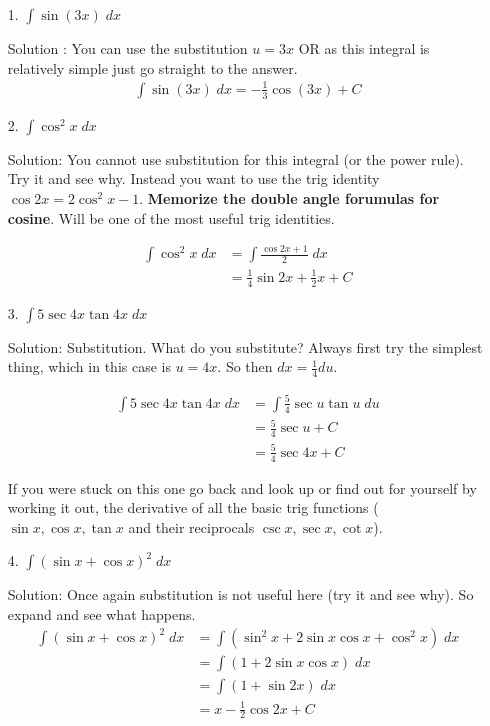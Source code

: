 \documentclass[11pt,reqno]{article}
\theoremstyle{definition}
\begin{document}
\newpage
\newpage
\begin{enumerate}
	\item[1.] $\int \sin(3x) \; dx$
	
	Solution : You can use the substitution $u = 3x$ OR as this integral is relatively simple just go straight to the answer.
	 \begin{align*}
		\int \sin (3x) \; dx = -\frac{1}{3} \cos (3x) + C
	\end{align*}
	
	\item[2.] $\int \cos^2 x \; dx$
	
	Solution: You cannot use substitution for this integral (or the power rule). Try it and see why. Instead you want to use the trig identity $\cos 2x = 2 \cos^2 x - 1$. \textbf{Memorize the double angle forumulas for cosine}. Will be one of the most useful trig identities. 
	
	\begin{align*}
		\int \cos^2 x \; dx &= \int \frac{\cos 2x + 1}{2} \; dx \\
						  &= \frac{1}{4} \sin 2x + \frac{1}{2} x + C
	\end{align*}
	
	\item[3.] $\int 5 \sec 4x  \tan 4x \; dx$
	
	Solution: Substitution. What do you substitute? Always first try the simplest thing, which in this case is $ u = 4x$. So then $dx = \frac{1}{4} du$. 
	
	\begin{align*}
		\int 5 \sec 4x  \tan 4x \; dx &= \int \frac{5}{4} \sec u \tan u \; du \\
									  &= \frac{5}{4} \sec u + C \\
									  &= \frac{5}{4} \sec 4x + C
	\end{align*}
	
	If you were stuck on this one go back and look up or find out for yourself by working it out, the derivative of all the basic trig functions ($\sin x, \cos x, \tan x$ and their reciprocals $\csc x, \sec x, \cot x$). 
	
	\item[4.] $\int (\sin x + \cos x)^2 \; dx$
	
	Solution: Once again substitution is not useful here (try it and see why). So expand and see what happens.
	\begin{align}
		\int (\sin x + \cos x)^2 \; dx &= \int (\sin^2 x + 2 \sin x \cos x + \cos^2 x) \; dx \\
									   &= \int (1 + 2 \sin x \cos x) \; dx \\
									   &= \int (1 + \sin 2x ) \; dx \\
									   &= x - \frac{1}{2} \cos 2x + C 
	\end{align}
	

\end{enumerate}
\end{document}
